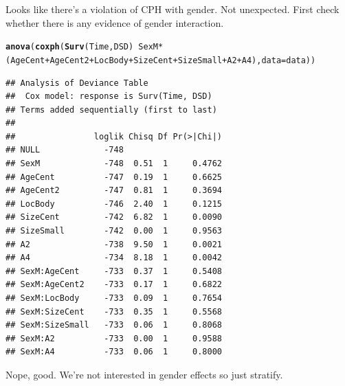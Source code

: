 \documentclass{article}\usepackage[]{graphicx}\usepackage[]{color}
\makeatletter
\newcommand{\hlopt}[1]{\textcolor[rgb]{0,0,0}{#1}}%
\newcommand{\hlstd}[1]{\textcolor[rgb]{0.345,0.345,0.345}{#1}}%
\newcommand{\hlkwc}[1]{\textcolor[rgb]{0.333,0.667,0.333}{#1}}%
\newcommand{\hlkwd}[1]{\textcolor[rgb]{0.737,0.353,0.396}{\textbf{#1}}}%
\newenvironment{kframe}{%
 \def\at@end@of@kframe{}%
 \ifinner\ifhmode%
  \def\at@end@of@kframe{\end{minipage}}%
  \begin{minipage}{\columnwidth}%
 \fi\fi%
 \def\FrameCommand##1{\hskip\@totalleftmargin \hskip-\fboxsep
 \colorbox{shadecolor}{##1}\hskip-\fboxsep
     \hskip-\linewidth \hskip-\@totalleftmargin \hskip\columnwidth}%
 \MakeFramed {\advance\hsize-\width
   \@totalleftmargin\z@ \linewidth\hsize
   \@setminipage}}%
 {\par\unskip\endMakeFramed%
 \at@end@of@kframe}
\newenvironment{knitrout}{}{} %
\makeatother
\begin{document}
Looks like there's a violation of CPH with gender.  Not unexpected.  First check whether there is any evidence of gender interaction.
\begin{knitrout}
\color{fgcolor}\begin{kframe}
\begin{alltt}
\hlkwd{anova}\hlstd{(}\hlkwd{coxph}\hlstd{(}\hlkwd{Surv}\hlstd{(Time, DSD)} \hlopt{~} \hlstd{SexM}\hlopt{*}\hlstd{(AgeCent} \hlopt{+} \hlstd{AgeCent2} \hlopt{+} \hlstd{LocBody} \hlopt{+} \hlstd{SizeCent} \hlopt{+} \hlstd{SizeSmall} \hlopt{+} \hlstd{A2} \hlopt{+} \hlstd{A4),} \hlkwc{data} \hlstd{= data))}
\end{alltt}
\begin{verbatim}
## Analysis of Deviance Table
##  Cox model: response is Surv(Time, DSD)
## Terms added sequentially (first to last)
## 
##                loglik Chisq Df Pr(>|Chi|)
## NULL             -748                    
## SexM             -748  0.51  1     0.4762
## AgeCent          -747  0.19  1     0.6625
## AgeCent2         -747  0.81  1     0.3694
## LocBody          -746  2.40  1     0.1215
## SizeCent         -742  6.82  1     0.0090
## SizeSmall        -742  0.00  1     0.9563
## A2               -738  9.50  1     0.0021
## A4               -734  8.18  1     0.0042
## SexM:AgeCent     -733  0.37  1     0.5408
## SexM:AgeCent2    -733  0.17  1     0.6822
## SexM:LocBody     -733  0.09  1     0.7654
## SexM:SizeCent    -733  0.35  1     0.5568
## SexM:SizeSmall   -733  0.06  1     0.8068
## SexM:A2          -733  0.00  1     0.9588
## SexM:A4          -733  0.06  1     0.8000
\end{verbatim}
\end{kframe}
\end{knitrout}
Nope, good.  We're not interested in gender effects so just stratify.
\end{document}

